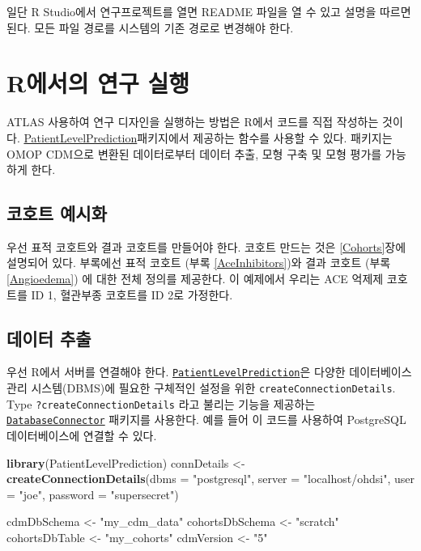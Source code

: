 \documentclass[11pt]{book}
\newenvironment{Shaded}{\begin{snugshade}}{\end{snugshade}}
\newcommand{\KeywordTok}[1]{\textcolor[rgb]{0.13,0.29,0.53}{\textbf{#1}}}
\newcommand{\DataTypeTok}[1]{\textcolor[rgb]{0.13,0.29,0.53}{#1}}
\newcommand{\StringTok}[1]{\textcolor[rgb]{0.31,0.60,0.02}{#1}}
\newcommand{\NormalTok}[1]{#1}
\theoremstyle{definition}
\theoremstyle{definition}
\theoremstyle{definition}
\theoremstyle{remark}
\begin{document}
일단 R Studio에서 연구프로젝트를 열면 README 파일을 열 수 있고 설명을
따르면 된다. 모든 파일 경로를 시스템의 기존 경로로 변경해야 한다.

\section{R에서의 연구 실행}\label{r--}

ATLAS 사용하여 연구 디자인을 실행하는 방법은 R에서 코드를 직접 작성하는
것이다.
\href{https://ohdsi.github.io/PatientLevelPrediction/}{PatientLevelPrediction}패키지에서
제공하는 함수를 사용할 수 있다. 패키지는 OMOP CDM으로 변환된
데이터로부터 데이터 추출, 모형 구축 및 모형 평가를 가능하게 한다.

\subsection{코호트 예시화}\label{-}

우선 표적 코호트와 결과 코호트를 만들어야 한다. 코호트 만드는 것은
\ref{Cohorts}장에 설명되어 있다. 부록에선 표적 코호트 (부록
\ref{AceInhibitors})와 결과 코호트 (부록 \ref{Angioedema}) 에 대한 전체
정의를 제공한다. 이 예제에서 우리는 ACE 억제제 코호트를 ID 1, 혈관부종
코호트를 ID 2로 가정한다.

\subsection{데이터 추출}\label{--1}

우선 R에서 서버를 연결해야 한다.
\href{https://ohdsi.github.io/PatientLevelPrediction/}{\texttt{PatientLevelPrediction}}은
다양한 데이터베이스 관리 시스템(DBMS)에 필요한 구체적인 설정을 위한
\texttt{createConnectionDetails}. Type \texttt{?createConnectionDetails}
라고 불리는 기능을 제공하는
\href{https://ohdsi.github.io/DatabaseConnector/}{\texttt{DatabaseConnector}}
패키지를 사용한다. 예를 들어 이 코드를 사용하여 PostgreSQL
데이터베이스에 연결할 수 있다.

\begin{Shaded}
\begin{Highlighting}[]
\KeywordTok{library}\NormalTok{(PatientLevelPrediction)}
\NormalTok{connDetails <-}\StringTok{ }\KeywordTok{createConnectionDetails}\NormalTok{(}\DataTypeTok{dbms =} \StringTok{"postgresql"}\NormalTok{,}
                                       \DataTypeTok{server =} \StringTok{"localhost/ohdsi"}\NormalTok{,}
                                       \DataTypeTok{user =} \StringTok{"joe"}\NormalTok{,}
                                       \DataTypeTok{password =} \StringTok{"supersecret"}\NormalTok{)}

\NormalTok{cdmDbSchema <-}\StringTok{ "my_cdm_data"}
\NormalTok{cohortsDbSchema <-}\StringTok{ "scratch"}
\NormalTok{cohortsDbTable <-}\StringTok{ "my_cohorts"}
\NormalTok{cdmVersion <-}\StringTok{ "5"}
\end{Highlighting}
\end{Shaded}
\end{document}
